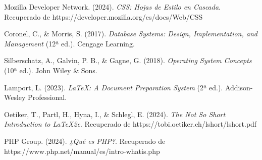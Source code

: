 \documentclass[12pt, letterpaper]{article}
\begin{document}
\begin{thebibliography}{99}
Mozilla Developer Network. (2024). \textit{CSS: Hojas de Estilo en Cascada}. Recuperado de https://developer.mozilla.org/es/docs/Web/CSS

Coronel, C., \& Morris, S. (2017). \textit{Database Systems: Design, Implementation, and Management} (12ª ed.). Cengage Learning.

Silberschatz, A., Galvin, P. B., \& Gagne, G. (2018). \textit{Operating System Concepts} (10ª ed.). John Wiley \& Sons.

Lamport, L. (2023). \textit{LaTeX: A Document Preparation System} (2ª ed.). Addison-Wesley Professional.

Oetiker, T., Partl, H., Hyna, I., \& Schlegl, E. (2024). \textit{The Not So Short Introduction to LaTeX2e}. Recuperado de https://tobi.oetiker.ch/lshort/lshort.pdf

PHP Group. (2024). \textit{¿Qué es PHP?}. Recuperado de https://www.php.net/manual/es/intro-whatis.php

\end{thebibliography}

\end{document}
